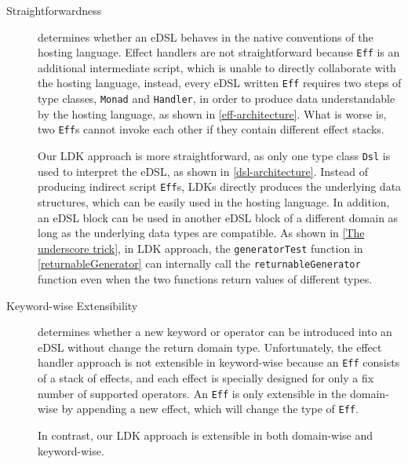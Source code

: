 \begin{description}
  \item[Straightforwardness] determines whether an eDSL behaves in the native conventions of the hosting language. Effect handlers are not straightforward because \lstinline{Eff} is an additional intermediate script, which is unable to directly collaborate with the hosting language, instead, every eDSL written \lstinline{Eff} requires two steps of type classes, \lstinline{Monad} and \lstinline{Handler}, in order to produce data understandable by the hosting language, as shown in \cref{eff-architecture}. What is worse is, two \lstinline{Eff}s cannot invoke each other if they contain different effect stacks.

  Our LDK approach is more straightforward, as only one type class \lstinline{Dsl} is used to interpret the eDSL, as shown in \cref{dsl-architecture}. Instead of producing indirect script \lstinline{Eff}s, LDKs directly produces the underlying data structures, which can be easily used in the hosting language. In addition, an eDSL block can be used in another eDSL block of a different domain as long as the underlying data types are compatible. As shown in \cref{The underscore trick}, in LDK approach, the \lstinline{generatorTest} function in \cref{returnableGenerator} can internally call the \lstinline{returnableGenerator} function even when the two functions return values of different types.

  \item[Keyword-wise Extensibility] determines whether a new keyword or operator can be introduced into an eDSL without change the return domain type. Unfortunately, the effect handler approach is not extensible in keyword-wise because an \lstinline{Eff} consists of a stack of effects, and each effect is specially designed for only a fix number of supported operators. An \lstinline{Eff} is only extensible in the domain-wise by appending a new effect, which will change the type of \lstinline{Eff}. 

  In contrast, our LDK approach is extensible in both domain-wise and keyword-wise.

\end{description}

